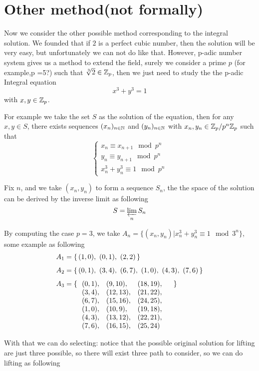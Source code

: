 \section{Other method(not formally)}
Now we consider the other possible method corresponding to the integral solution. We founded that if \(2\) is a perfect cubic number, then the solution will be very easy, but unfortunately we can not do like that. However, p-adic number system gives us a method to extend the field, surely we consider a prime \(p\) (for example,p =5?) such that \(\sqrt[3]{2} \in \mathbb{Z}_p\), then we just need to study the the p-adic Integral equation
\[x^3+y^3=1\]
with \(x,y \in \mathbb{Z}_p\).

For example we take the set \(S\) as the solution of the equation,
then for any \(x,y \in S\), there exists sequences \((x_n)_{n \in \mathbb{N}}\) and \((y_n)_{n \in \mathbb{N}}\) with
\(x_n, y_n \in \mathbb{Z}_p/p^n\mathbb{Z}_p\) such that
\[\begin{cases}
    x_n \equiv x_{n+1} \mod {p^n} \\
    y_n \equiv y_{n+1} \mod {p^n} \\
    x_n^3+y_n^3 \equiv 1 \mod {p^n}
\end{cases}\]

Fix \(n\), and we take \((x_n,y_n)\) to form a sequence \(S_n\), the the space of the solution can be derived by the inverse limit as following
\[S = \varprojlim_{n} S_n\]

By computing the case \(p=3\), we take \(A_n = \{(x_n,y_n)| x^3_n+y^3_n \equiv 1 \mod 3^n \}\), some example as following
\begin{align*}
    A_1 &= \{\, (1,0),\ (0,1),\ (2,2) \,\} \\[1ex]
    A_2 &= \{\, 
        (0,1),\ (3,4),\ (6,7),\ 
        (1,0),\ (4,3),\ (7,6)
    \,\} \\[1ex]
    A_3 &= \{\, 
    \begin{array}[t]{llll}
        (0,1), & (9,10), & (18,19), & \\
        (3,4), & (12,13), & (21,22), & \\
        (6,7), & (15,16), & (24,25), & \\
        (1,0), & (10,9), & (19,18), & \\
        (4,3), & (13,12), & (22,21), & \\
        (7,6), & (16,15), & (25,24) &
    \end{array}
    \,\}
    \end{align*}

    With that we can do selecting: notice that the possible original solution for lifting are just three possible, so there will exist three path to consider, so we can do lifting as following

